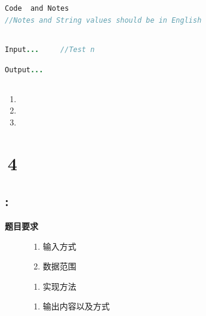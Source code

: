 \documentclass{article}
\begin{document}
\subsection{}
\begin{center}
	\begin{lstlisting}[language = Java]
Code  and Notes        
//Notes and String values should be in English
	\end{lstlisting}
\end{center}


\subsection{}
\begin{center}
	\begin{lstlisting}[language = Java]
Input...     //Test n
	\end{lstlisting}
\end{center}

\begin{center}
\begin{lstlisting}[language = Java]
Output...
\end{lstlisting}
\end{center}
\subsection{}
\begin{enumerate}
	\item\kaishu
	\item\kaishu
	\item\kaishu
\end{enumerate}
\newpage


\section{\,4}

\subsection{:}
\noindent\kaishu \textbf{题目要求}
\begin{description}
	\item [\kaishu输入]
	\begin{enumerate}
		\item \kaishu 输入方式
		\item \kaishu 数据范围
	\end{enumerate}
	\item [\kaishu实现]
	\begin{enumerate}
		\item 实现方法
		\end{enumerate}
	\item [\kaishu输出]
	\begin{enumerate}
		\item []\kaishu 输出内容以及方式
	\end{enumerate}
\end{description}
\end{document}
